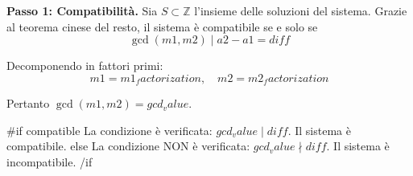 \textbf{Passo 1: Compatibilità.} 
Sia $S \subset \mathbb{Z}$ l'insieme delle soluzioni del sistema.
Grazie al teorema cinese del resto, il sistema è compatibile se e solo se
$$\gcd({{m1}}, {{m2}}) \mid {{a2}} - {{a1}} = {{diff}}$$

Decomponendo in fattori primi:
$${{m1}} = {{m1_factorization}}, \quad {{m2}} = {{m2_factorization}}$$

Pertanto $\gcd({{m1}}, {{m2}}) = {{gcd_value}}$.

{{#if compatible}}
La condizione è verificata: ${{gcd_value}} \mid {{diff}}$. Il sistema è compatibile.
{{else}}
La condizione NON è verificata: ${{gcd_value}} \nmid {{diff}}$. Il sistema è incompatibile.
{{/if}} 